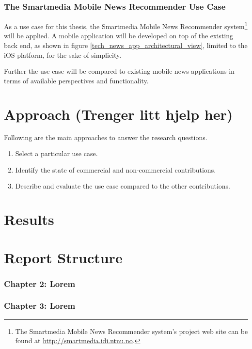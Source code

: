 \subsubsection{The Smartmedia Mobile News Recommender Use Case}
As a use case for this thesis, the Smartmedia Mobile News Recommender system\footnote{The Smartmedia Mobile News Recommender system's project web site can be found at \url{http://smartmedia.idi.ntnu.no}.} will be applied. A mobile application will be developed on top of the existing back end, as shown in figure \ref{tech_news_app_architectural_view}, limited to the iOS platform, for the sake of simplicity.

Further the use case will be compared to existing mobile news applications in terms of available perspectives and functionality.

\section{Approach (Trenger litt hjelp her)}
Following are the main approaches to answer the research questions.

\begin{enumerate}
	\item Select a particular use case.
	\item Identify the state of commercial and non-commercial contributions.
	\item Describe and evaluate the use case compared to the other contributions.
\end{enumerate}


\section{Results}


\section{Report Structure}

\subsubsection{Chapter 2: Lorem}

\subsubsection{Chapter 3: Lorem}